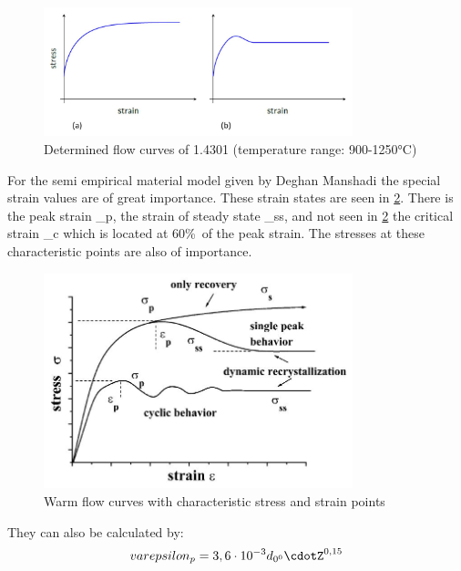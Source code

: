 \begin{figure}[htbp]
 \centering
 \includegraphics[width=0.8\textwidth]{images/flowcurves}
 \caption{Determined flow curves of 1.4301 (temperature range: 900-1250°C)}
 \label{img:flowcurves}
\end{figure}

For the semi empirical material model given by Deghan Manshadi \cite{DEG08} the special strain values are of great importance. These strain states are seen in \ref{img:stressstrainpoints}. There is the peak strain \varepsilon_{p}, the strain of steady state \varepsilon_{ss}, and not seen in \ref{img:stressstrainpoints} the critical strain \varepsilon_{c} which is located at 60\%\ of the peak strain. The stresses at these characteristic points are also of importance.

\begin{figure}[htbp]
 \centering
 \includegraphics[width=0.8\textwidth]{images/stressstrainpoints}
 \caption{Warm flow curves with characteristic stress and strain points \cite{ELW03}}
 \label{img:stressstrainpoints}
\end{figure}

They can also be calculated by:
\begin{equation}
 varepsilon_{p} = 3,6\cdot10^{-3}d_{0^{0}}\cdotZ^{0,15}
\end{equation}

